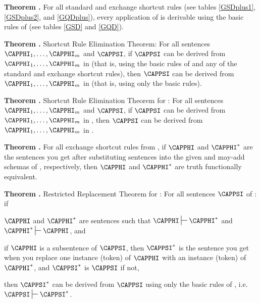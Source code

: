 \begin{majorILnc}{\textbf{Theorem .}}
For all standard and exchange shortcut rules  (see tables \ref{GSDplus1}, \ref{GSDplus2}, and \ref{GQDplus}), every application of  is derivable using the basic rules of \GQD{} (see tables \ref{GSD} and \ref{GQD}).
\end{majorILnc}

\begin{majorILnc}{\textbf{Theorem .} Shortcut Rule Elimination Theorem:}
For all \GSL{} sentences $\CAPPHI_1,\ldots,\CAPPHI_{\integer{m}}$ and $\CAPPSI$, if $\CAPPSI$ can be derived from $\CAPPHI_1,\ldots,\CAPPHI_{\integer{m}}$ in \GSDP{} (that is, using the basic rules of \GSD{} and any of the standard and exchange shortcut rules), then $\CAPPSI$ can be derived from $\CAPPHI_1,\ldots,\CAPPHI_{\integer{m}}$ in \GSD{} (that is, using only the basic rules).
\end{majorILnc}

\begin{majorILnc}{\textbf{Theorem .} Shortcut Rule Elimination Theorem for \GQDP{}:}
For all \GQL{} sentences $\CAPPHI_1,\ldots,\CAPPHI_{\integer{m}}$ and $\CAPPSI$, if $\CAPPSI$ can be derived from $\CAPPHI_1,\ldots,\CAPPHI_{\integer{m}}$ in \GQDP{}, then $\CAPPSI$ can be derived from $\CAPPHI_1,\ldots,\CAPPHI_{\integer{m}}$ in \GQD{}.
\end{majorILnc}

\begin{majorILnc}{\textbf{Theorem .}}
For all exchange shortcut rules  from \GSDP{}, if $\CAPPHI$ and $\CAPPHI^*$ are the sentences you get after substituting \GSL{} sentences into the given and may-add schemas of , respectively, then $\CAPPHI$ and $\CAPPHI^*$ are truth functionally equivalent. 
\end{majorILnc}

\begin{majorILnc}{\textbf{Theorem .} Restricted Replacement Theorem for \GSD{}:}
For all sentences $\CAPPSI$ of \GSL{}: if
\begin{cenumerate}
\item $\CAPPHI$ and $\CAPPHI^*$ are \GSL{} sentences such that $\CAPPHI\sststile{}{}\CAPPHI^*$ and $\CAPPHI^*\sststile{}{}\CAPPHI$, and
\item if $\CAPPHI$ is a subsentence of $\CAPPSI$, then $\CAPPSI^*$ is the \GSL{} sentence you get when you replace one instance (token) of $\CAPPHI$ with an instance (token) of $\CAPPHI^*$, and $\CAPPSI^*$ is $\CAPPSI$ if not, 
\end{cenumerate}
then $\CAPPSI^*$ can be derived from $\CAPPSI$ using only the basic rules of \GSD{}, i.e. $\CAPPSI\sststile{}{}\CAPPSI^*$.
\end{majorILnc}

